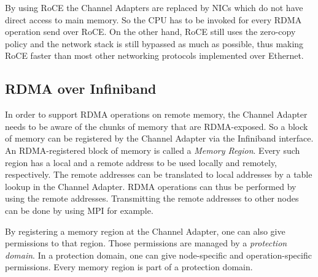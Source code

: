 By using RoCE the Channel Adapters are replaced by NICs which do not have direct access to main memory. So the CPU has to be invoked for every RDMA operation send over RoCE. On the other hand, RoCE still uses the zero-copy policy and the network stack is still bypassed as much as possible, thus making RoCE faster than most other networking protocols implemented over Ethernet.

\subsection{RDMA over Infiniband}
In order to support RDMA operations on remote memory, the Channel Adapter needs to be aware of the chunks of memory that are RDMA-exposed. So a block of memory can be registered by the Channel Adapter via the Infiniband interface. An RDMA-registered block of memory is called a \emph{Memory Region}. Every such region has a local and a remote address to be used locally and remotely, respectively. The remote addresses can be translated to local addresses by a table lookup in the Channel Adapter. RDMA operations can thus be performed by using the remote addresses. Transmitting the remote addresses to other nodes can be done by using MPI for example.

By registering a memory region at the Channel Adapter, one can also give permissions to that region. Those permissions are managed by a \emph{protection domain}. In a protection domain, one can give node-specific and operation-specific permissions. Every memory region is part of a protection domain.

